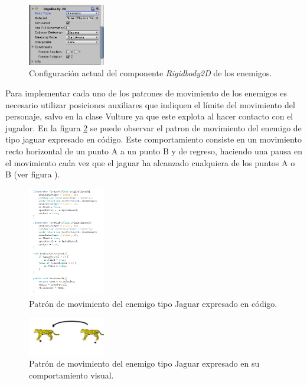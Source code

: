 \begin{itemize}
		 	\begin{figure}[h]
    			\centering
    			\includegraphics[width=0.3\textwidth]{03TrabajoRealizado/imagenes/Colisonador02.png}
    			\caption{Configuración actual del componente \textit{Rigidbody2D} de 
    			los enemigos.}
    			\label{fig:EnemyRigidBody}
			\end{figure}
	\end{itemize}

Para implementar cada uno de los patrones de movimiento de los enemigos es necesario 
utilizar posiciones auxiliares que indiquen el límite del movimiento del personaje, 
salvo en la clase Vulture ya que este explota al hacer contacto con el jugador. En la figura \ref{fig:JaguarCode} se puede observar el patron de movimiento del enemigo de tipo jaguar expresado en código. Este comportamiento consiste en un movimiento recto horizontal de un punto A a un punto B y de regreso, haciendo una pausa en el movimiento cada vez que el jaguar ha alcanzado cualquiera de los puntos A o B (ver figura ). 
\\
\par
			\begin{figure}[h]
    			\centering
    			\includegraphics[width=0.3\textwidth]{03TrabajoRealizado/imagenes/PatronJaguar.png}
    			\caption{Patrón de movimiento del enemigo tipo Jaguar expresado en 
    			código.}
    			\label{fig:JaguarCode}
			\end{figure}
			
			\begin{figure}[h]
    			\centering
    			\includegraphics[width=0.3\textwidth]{03TrabajoRealizado/imagenes/saltoFelino.jpg}
    			\caption{Patrón de movimiento del enemigo tipo Jaguar expresado en 
    			su comportamiento visual.}
    			\label{fig:JaguarBeha}
			\end{figure}


